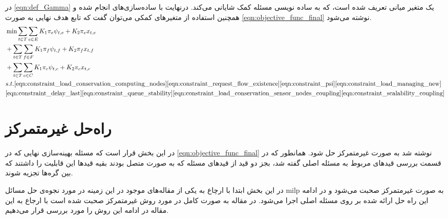 	در \cref{eqn:def_Gamma} یک متغیر میانی تعریف شده است، که به ساده نویسی مسئله کمک شایانی می‌کند. 
	درنهایت با ساده‌سازی‌های انجام شده و همچنین استفاده از متغیرهای کمکی می‌توان گفت که تابع هدف نهایی به صورت \cref{eqn:objective_func_final} نوشته می‌شود. 
	\begin{align}
		&\min \sum_{t \in T}\sum_{e \in E} 				K_1\pi_e\psi_{t,e}+K_2\pi_ex_{t,e}\notag \\
		&+\sum_{t \in T}\sum_{f \in F} 	K_1\pi_f\psi_{t,f}+K_2\pi_fx_{t,f}\notag \\
		&+\sum_{t \in T}\sum_{c \in C} K_1\pi_c\psi_{t,c}+K_2\pi_cx_{t,c} \label{eqn:objective_func_final} \notag \\
		&s.t. 
		\cref{eqn:constraint_load_conservation_computing_nodes}
		\cref{eqn:constraint_request_flow_existence}				\cref{eqn:constraint_psi}
		\cref{eqn:constraint_load_managing_new} \notag \\
		&\cref{eqn:constraint_delay_last}
		\cref{eqn:constraint_queue_stability}
		\cref{eqn:constraint_load_conservation_sensor_nodes_coupling}
		\cref{eqn:constraint_scalability_coupling}
	\end{align}
	
	\section{راه‌حل غیرمتمرکز}
	در این بخش قرار است که مسئله بهینه‌سازی نهایی که در \cref{eqn:objective_func_final} نوشته شد به صورت غیرمتمرکز حل شود. 
	همانطور که در قسمت بررسی قیدهای مربوط به مسئله اصلی گفته شد، بجز دو قید از قیدهای مسئله که به صورت متصل بودند بقیه قیدها این قابلیت را داشتند که بین گره‌ها تجزیه شوند. 
	
	در این بخش ابتدا با ارچاع به یکی از مقاله‌های موجود در این زمینه در مورد نجوه‌ی حل مسائل milp به صورت غیرمتمرکز صحبت می‌شود و در ادامه این راه حل ارائه شده بر روی مسئله اصلی اجرا می‌شود. 
	در مقاله \cite{decentralized_approach} به صورت کامل در مورد روش غیرمتمرکز صحبت شده است با ارجاع به این مقاله در ادامه این روش را مورد بررسی قرار می‌دهیم. 
	
